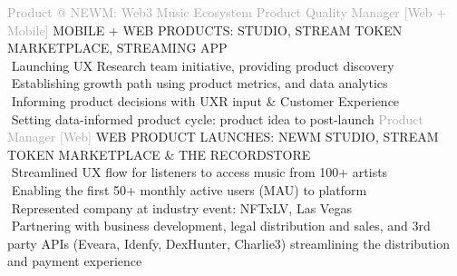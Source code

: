 \begin{cvtable}
    {\textcolor{darkgray} {Product \newline @ NEWM: Web3 Music Ecosystem } }
    { }{{ {    } }}
%
    {\textcolor{darkgray}
    {
    Product Quality Manager [Web + Mobile] %
    }
    }
    { }%
    {
    {
    {\scriptsize
    MOBILE +
    WEB
    PRODUCTS: STUDIO, STREAM TOKEN MARKETPLACE, STREAMING APP
    } \\
        \textperiodcentered $ $ Launching UX Research team initiative,
providing product discovery \\
     \textperiodcentered $ $ Establishing growth path using product metrics, and data analytics \\
          \textperiodcentered $ $ Informing product decisions
          with UXR input \& Customer Experience
          \\
     \textperiodcentered $ $ Setting data-informed product cycle:
     product idea to post-launch %
    }}
%
%
    {\textcolor{darkgray}{
    Product 
    Manager
    [Web]
    }}%
    {
    }%
    {%
    {\scriptsize
    WEB
    PRODUCT
    LAUNCHES: NEWM STUDIO, STREAM TOKEN MARKETPLACE \& THE RECORDSTORE} \\
\textperiodcentered $ $ Streamlined UX flow for listeners to access music from 100+ artists \\
\textperiodcentered $ $ Enabling the first 50+ monthly active users (MAU) to platform \\
\textperiodcentered $ $
  Represented company %
  at industry event: NFTxLV, Las Vegas \\
\textperiodcentered $ $ Partnering with %
business development,
legal
distribution and sales,
  and 3rd party APIs (Eveara, Idenfy, DexHunter, Charlie3)
  streamlining the distribution and payment experience %
}


\end{cvtable}
